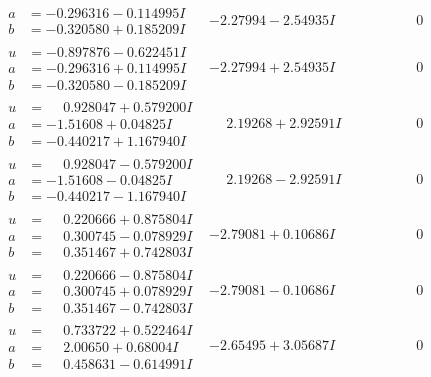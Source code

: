 \documentclass[1p]{elsarticle_modified}
\theoremstyle{definition}
\begin{document}
$$\begin{array}{c|c|c}
\begin{aligned}
a &= -0.296316 - 0.114995 I \\
b &= -0.320580 + 0.185209 I\end{aligned}
 & -2.27994 - 2.54935 I & \phantom{-0.000000 } 0 \\ \hline\begin{aligned}
u &= -0.897876 - 0.622451 I \\
a &= -0.296316 + 0.114995 I \\
b &= -0.320580 - 0.185209 I\end{aligned}
 & -2.27994 + 2.54935 I & \phantom{-0.000000 } 0 \\ \hline\begin{aligned}
u &= \phantom{-}0.928047 + 0.579200 I \\
a &= -1.51608 + 0.04825 I \\
b &= -0.440217 + 1.167940 I\end{aligned}
 & \phantom{-}2.19268 + 2.92591 I & \phantom{-0.000000 } 0 \\ \hline\begin{aligned}
u &= \phantom{-}0.928047 - 0.579200 I \\
a &= -1.51608 - 0.04825 I \\
b &= -0.440217 - 1.167940 I\end{aligned}
 & \phantom{-}2.19268 - 2.92591 I & \phantom{-0.000000 } 0 \\ \hline\begin{aligned}
u &= \phantom{-}0.220666 + 0.875804 I \\
a &= \phantom{-}0.300745 - 0.078929 I \\
b &= \phantom{-}0.351467 + 0.742803 I\end{aligned}
 & -2.79081 + 0.10686 I & \phantom{-0.000000 } 0 \\ \hline\begin{aligned}
u &= \phantom{-}0.220666 - 0.875804 I \\
a &= \phantom{-}0.300745 + 0.078929 I \\
b &= \phantom{-}0.351467 - 0.742803 I\end{aligned}
 & -2.79081 - 0.10686 I & \phantom{-0.000000 } 0 \\ \hline\begin{aligned}
u &= \phantom{-}0.733722 + 0.522464 I \\
a &= \phantom{-}2.00650 + 0.68004 I \\
b &= \phantom{-}0.458631 - 0.614991 I\end{aligned}
 & -2.65495 + 3.05687 I & \phantom{-0.000000 } 0 \\ \hline\begin{aligned}

\end{aligned}
\end{array}$$
\end{document}
